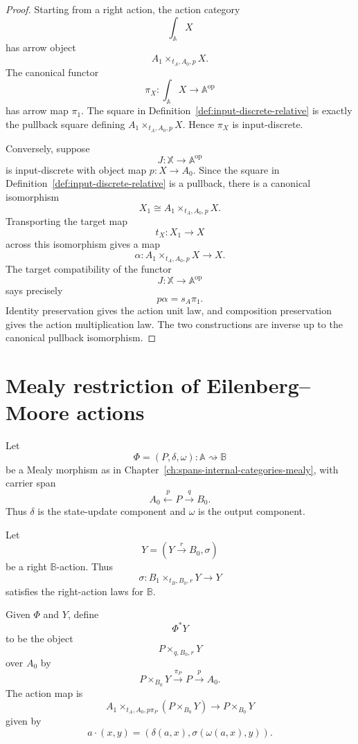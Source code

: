 \begin{proof}
Starting from a right action, the action category
\[
\int_{\mathbb A}X
\]
has arrow object
\[
A_1\times_{t_A,A_0,p}X.
\]
The canonical functor
\[
\pi_X:\int_{\mathbb A}X\to\mathbb A^{\mathrm{op}}
\]
has arrow map \(\pi_1\). The square in
Definition~\ref{def:input-discrete-relative} is exactly the pullback square
defining \(A_1\times_{t_A,A_0,p}X\). Hence \(\pi_X\) is input-discrete.

Conversely, suppose
\[
J:\mathbb X\to\mathbb A^{\mathrm{op}}
\]
is input-discrete with object map \(p:X\to A_0\). Since the square in
Definition~\ref{def:input-discrete-relative} is a pullback, there is a
canonical isomorphism
\[
X_1\cong A_1\times_{t_A,A_0,p}X.
\]
Transporting the target map
\[
t_X:X_1\to X
\]
across this isomorphism gives a map
\[
\alpha:A_1\times_{t_A,A_0,p}X\to X.
\]
The target compatibility of the functor
\[
J:\mathbb X\to\mathbb A^{\mathrm{op}}
\]
says precisely
\[
p\alpha=s_A\pi_1.
\]
Identity preservation gives the action unit law, and composition preservation
gives the action multiplication law. The two constructions are inverse up to
the canonical pullback isomorphism.
\end{proof}

\section{Mealy restriction of Eilenberg--Moore actions}
\label{sec:mealy-restriction-em-actions}

Let
\[
\Phi=(P,\delta,\omega):\mathbb A\rightsquigarrow\mathbb B
\]
be a Mealy morphism as in Chapter~\ref{ch:spans-internal-categories-mealy},
with carrier span
\[
A_0\xleftarrow{p}P\xrightarrow{q}B_0.
\]
Thus \(\delta\) is the state-update component and \(\omega\) is the output
component.

Let
\[
Y=(Y\xrightarrow{r}B_0,\sigma)
\]
be a right \(\mathbb B\)-action. Thus
\[
\sigma:B_1\times_{t_B,B_0,r}Y\to Y
\]
satisfies the right-action laws for \(\mathbb B\).

\begin{definition}
\label{def:mealy-restriction-action}
Given \(\Phi\) and \(Y\), define
\[
\Phi^\ast Y
\]
to be the object
\[
P\times_{q,B_0,r}Y
\]
over \(A_0\) by
\[
P\times_{B_0}Y
\xrightarrow{\pi_P}
P
\xrightarrow{p}
A_0.
\]
The action map is
\[
A_1\times_{t_A,A_0,p\pi_P}(P\times_{B_0}Y)
\to
P\times_{B_0}Y
\]
given by
\[
a\cdot(x,y)
=
\left(
\delta(a,x),
\sigma(\omega(a,x),y)
\right).
\]
\end{definition}

